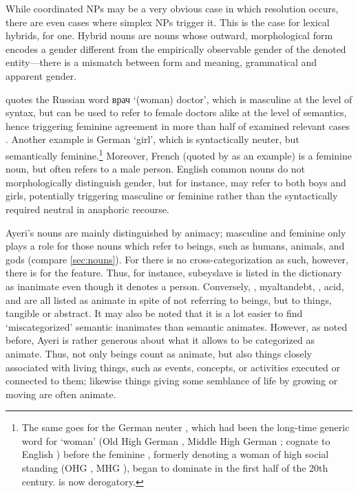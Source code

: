 
While coordinated NPs may be a very obvious case in which resolution occurs,
there are even cases where simplex NPs trigger it. This is the case for lexical
hybrids, for one. Hybrid nouns are nouns whose outward, morphological form
encodes a gender different from the empirically observable gender of the
denoted entity---there is a mismatch between form and meaning, grammatical and
apparent gender.

\citet{corbett2006} quotes the Russian word {\FS врач}
 `(woman) doctor', which is masculine at the level of syntax, but can
be used to refer to female doctors alike at the level of semantics, hence
triggering feminine agreement in more than half of examined relevant cases
\citep[158]{corbett2006}. Another example is German  `girl',
which is syntactically neuter, but semantically feminine.\footnote{The same
goes for the German neuter  \parencite[compare][165--166]
{fleischer2012}, which had been the long-time generic word for `woman' (Old
High German , Middle High German ; cognate to English
) before the feminine , formerly denoting a woman of high
social standing (OHG , MHG ), began to dominate in the
first half of the 20th century.  is now derogatory.} Moreover, French
 (quoted by \cite{wechsler2009} as an example) is a feminine
noun, but often refers to a male person. English common nouns do not
morphologically distinguish gender, but for instance,  may refer to
both boys and girls, potentially triggering masculine  or feminine
 rather than the syntactically required neutral  in anaphoric
recourse.

Ayeri's nouns are mainly distinguished by animacy; masculine and feminine only
plays a role for those nouns which refer to beings, such as humans, animals,
and gods (compare \autoref{sec:nouns}). For \Gend{} there is no
cross-categorization as such, however, there is for the \Anim{} feature. Thus,
for instance,  {subey}{slave} is listed in the dictionary as
inanimate even though it denotes a person. Conversely,
,  {myaltan}{debt},
,  {acid}, and
 are all listed as animate in spite of not referring to
beings, but to things, tangible or abstract. It may also be noted that it is a
lot easier to find `miscategorized' semantic inanimates than semantic animates.
However, as noted before, Ayeri is rather generous about what it allows to be
categorized as animate. Thus, not only beings count as animate, but also things
closely associated with living things, such as events, concepts, or activities
executed or connected to them; likewise things giving some semblance of life
by growing or moving are often animate.

